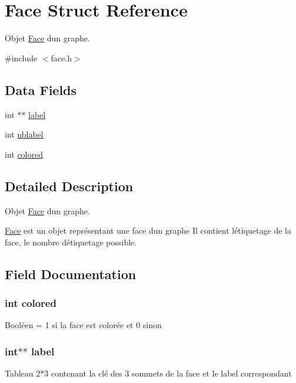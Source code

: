 \hypertarget{struct_face}{}\section{Face Struct Reference}
\label{struct_face}


Objet \hyperlink{struct_face}{Face} d\textquotesingle{}un graphe.  




{\ttfamily \#include $<$face.\+h$>$}

\subsection*{Data Fields}
\begin{DoxyCompactItemize}
\item 
int $\ast$$\ast$ \hyperlink{struct_face_a65c274eabdb228edc79d6b56f40d5e12}{label}
\item 
int \hyperlink{struct_face_ac9c2bd71228f143ad14ba5ba6cae2b0e}{nblabel}
\item 
int \hyperlink{struct_face_acafebd436ed979f8d6a04d8d31b312cb}{colored}
\end{DoxyCompactItemize}


\subsection{Detailed Description}
Objet \hyperlink{struct_face}{Face} d\textquotesingle{}un graphe. 

\hyperlink{struct_face}{Face} est un objet représentant une face d\textquotesingle{}un graphe Il contient l\textquotesingle{}étiquetage de la face, le nombre d\textquotesingle{}étiquetage possible. 

\subsection{Field Documentation}
\hypertarget{struct_face_acafebd436ed979f8d6a04d8d31b312cb}{}
\subsubsection[{colored}]{\setlength{\rightskip}{0pt plus 5cm}int colored}\label{struct_face_acafebd436ed979f8d6a04d8d31b312cb}
Booléen = 1 si la face est colorée et 0 sinon \hypertarget{struct_face_a65c274eabdb228edc79d6b56f40d5e12}{}
\subsubsection[{label}]{\setlength{\rightskip}{0pt plus 5cm}int$\ast$$\ast$ label}\label{struct_face_a65c274eabdb228edc79d6b56f40d5e12}
Tableau 2$\ast$3 contenant la clé des 3 sommets de la face et le label correspondant \hypertarget{struct_face_ac9c2bd71228f143ad14ba5ba6cae2b0e}{}

